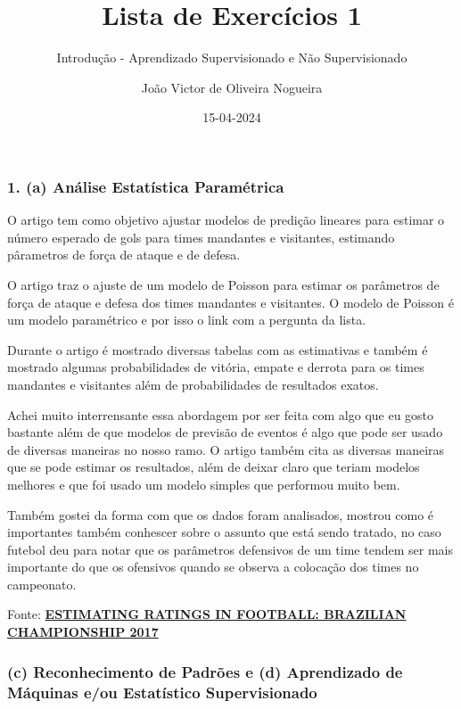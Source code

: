 \documentclass[
]{article}
\title{Lista de Exercícios 1}
\subtitle{Introdução - Aprendizado Supervisionado e Não Supervisionado}
\author{João Victor de Oliveira Nogueira}
\date{15-04-2024}
\begin{document}
\maketitle

\subsubsection{1. (a) Análise Estatística
Paramétrica}\label{a-anuxe1lise-estatuxedstica-paramuxe9trica}

O artigo tem como objetivo ajustar modelos de predição lineares para
estimar o número esperado de gols para times mandantes e visitantes,
estimando pârametros de força de ataque e de defesa.

O artigo traz o ajuste de um modelo de Poisson para estimar os
parâmetros de força de ataque e defesa dos times mandantes e visitantes.
O modelo de Poisson é um modelo paramétrico e por isso o link com a
pergunta da lista.

Durante o artigo é mostrado diversas tabelas com as estimativas e também
é mostrado algumas probabilidades de vitória, empate e derrota para os
times mandantes e visitantes além de probabilidades de resultados
exatos.

Achei muito interrensante essa abordagem por ser feita com algo que eu
gosto bastante além de que modelos de previsão de eventos é algo que
pode ser usado de diversas maneiras no nosso ramo. O artigo também cita
as diversas maneiras que se pode estimar os resultados, além de deixar
claro que teriam modelos melhores e que foi usado um modelo simples que
performou muito bem.

Também gostei da forma com que os dados foram analisados, mostrou como é
importantes também conhescer sobre o assunto que está sendo tratado, no
caso futebol deu para notar que os parâmetros defensivos de um time
tendem ser mais importante do que os ofensivos quando se observa a
colocação dos times no campeonato.

Fonte:
\textbf{\href{https://biometria.ufla.br/index.php/BBJ/article/view/403/253}{ESTIMATING
RATINGS IN FOOTBALL: BRAZILIAN CHAMPIONSHIP 2017}}

\subsubsection{(c) Reconhecimento de Padrões e (d) Aprendizado de
Máquinas e/ou Estatístico
Supervisionado}\label{c-reconhecimento-de-padruxf5es-e-d-aprendizado-de-muxe1quinas-eou-estatuxedstico-supervisionado}
\end{document}
